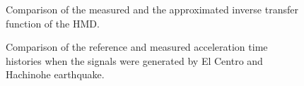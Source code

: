 \begin{figure}[!ht]
\centering
{}
\caption{Comparison of the measured and the approximated inverse transfer function of the HMD.}
\label{fig:7-10}
\end{figure}

\begin{figure}[!ht]
\centering
{}
\caption{Comparison of the reference and measured acceleration time histories when the signals were generated by El Centro and Hachinohe earthquake.}
\label{fig:7-11}
\end{figure}

